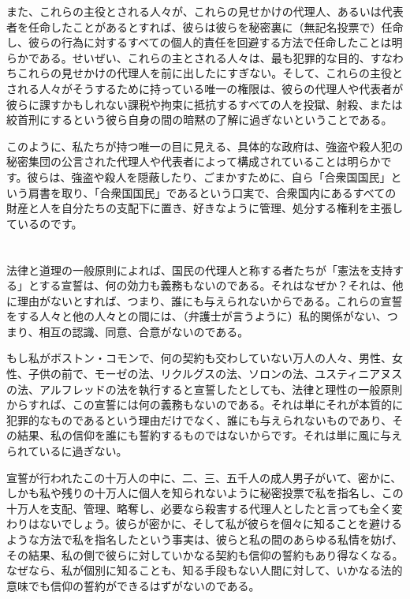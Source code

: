 \documentclass[dvipdfmx, uplatex, tate, landscape]{utbook}
\begin{document}
また、これらの主役とされる人々が、これらの見せかけの代理人、あるいは代表者を任命したことがあるとすれば、彼らは彼らを秘密裏に（無記名投票で）任命し、彼らの行為に対するすべての個人的責任を回避する方法で任命したことは明らかである。せいぜい、これらの主とされる人々は、最も犯罪的な目的、すなわちこれらの見せかけの代理人を前に出したにすぎない。そして、これらの主役とされる人々がそうするために持っている唯一の権限は、彼らの代理人や代表者が彼らに課すかもしれない課税や拘束に抵抗するすべての人を投獄、射殺、または絞首刑にするという彼ら自身の間の暗黙の了解に過ぎないということである。

このように、私たちが持つ唯一の目に見える、具体的な政府は、強盗や殺人犯の秘密集団の公言された代理人や代表者によって構成されていることは明らかです。彼らは、強盗や殺人を隠蔽したり、ごまかすために、自ら「合衆国国民」という肩書を取り、「合衆国国民」であるという口実で、合衆国内にあるすべての財産と人を自分たちの支配下に置き、好きなように管理、処分する権利を主張しているのです。

\chapter{}

法律と道理の一般原則によれば、国民の代理人と称する者たちが「憲法を支持する」とする宣誓は、何の効力も義務もないのである。それはなぜか？それは、他に理由がないとすれば、つまり、誰にも与えられないからである。これらの宣誓をする人々と他の人々との間には、（弁護士が言うように）私的関係がない、つまり、相互の認識、同意、合意がないのである。

もし私がボストン・コモンで、何の契約も交わしていない万人の人々、男性、女性、子供の前で、モーゼの法、リクルグスの法、ソロンの法、ユスティニアヌスの法、アルフレッドの法を執行すると宣誓したとしても、法律と理性の一般原則からすれば、この宣誓には何の義務もないのである。それは単にそれが本質的に犯罪的なものであるという理由だけでなく、誰にも与えられないものであり、その結果、私の信仰を誰にも誓約するものではないからです。それは単に風に与えられているに過ぎない。

宣誓が行われたこの十万人の中に、二、三、五千人の成人男子がいて、密かに、しかも私や残りの十万人に個人を知られないように秘密投票で私を指名し、この十万人を支配、管理、略奪し、必要なら殺害する代理人としたと言っても全く変わりはないでしょう。彼らが密かに、そして私が彼らを個々に知ることを避けるような方法で私を指名したという事実は、彼らと私の間のあらゆる私情を妨げ、その結果、私の側で彼らに対していかなる契約も信仰の誓約もあり得なくなる。なぜなら、私が個別に知ることも、知る手段もない人間に対して、いかなる法的意味でも信仰の誓約ができるはずがないのである。
\end{document}
